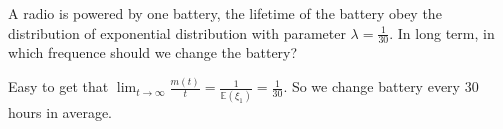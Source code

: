 \documentclass{ctexart}
\newif\ifpreface
\begin{document}
\large
\setlength{\baselineskip}{1.2em}
\ifpreface

\else
\fi
{}
\begin{problem}\label{pro:1}
  A radio is powered by one battery,
  the lifetime of the battery obey the distribution of exponential distribution
  with parameter \(\lambda = \frac{1}{30}\). In long term, in which frequence should we change the battery?
\end{problem}

\begin{solution}
  Easy to get that \(\lim_{t \to \infty}\frac{m(t)}{t}=\frac{1}{\mathbb{E}(\xi_1)}=\frac{1}{30}\).
  So we change battery every \(30\) hours in average.
\end{solution}
\end{document}
